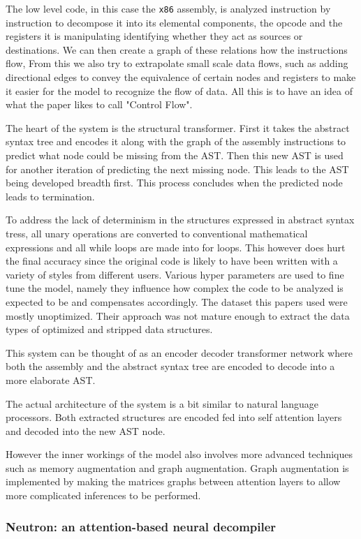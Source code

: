 \documentclass{article}
\begin{document}
The low level code, in this case the \verb|x86| assembly, is analyzed instruction by instruction to decompose it into its elemental components, the opcode and the registers it is manipulating identifying whether they act as sources or destinations.
We can then create a graph of these relations how the instructions flow,
From this we also try to extrapolate small scale data flows, such as adding directional edges to convey the equivalence of certain nodes and registers to make it easier for the model to recognize the flow of data.
All this is to have an idea of what the paper likes to call "Control Flow".

The heart of the system is the structural transformer.
First it takes the abstract syntax tree and encodes it along with the graph of the assembly instructions to predict what node could be missing from the AST.
Then this new AST is used for another iteration of predicting the next missing node.
This leads to the AST being developed breadth first.
This process concludes when the predicted node leads to termination.

To address the lack of determinism in the structures expressed in abstract syntax tress, all unary operations are converted to conventional mathematical expressions and all while loops are made into for loops.
This however does hurt the final accuracy since the original code is likely to have been written with a variety of styles from different users.
Various hyper parameters are used to fine tune the model, namely they influence how complex the code to be analyzed is expected to be and compensates accordingly.
The dataset this papers used were mostly unoptimized. Their approach was not mature enough to extract the data types of optimized and stripped data structures.

This system can be thought of as an encoder decoder transformer network where both the assembly and the abstract syntax tree are encoded to decode into a more elaborate AST.

The actual architecture of the system is a bit similar to natural language processors.
Both extracted structures are encoded fed into self attention layers and decoded into the new AST node.

However the inner workings of the model also involves more advanced techniques such as memory augmentation and graph augmentation.
Graph augmentation is implemented by making the matrices graphs between attention layers to allow more complicated inferences to be performed.

\subsubsection{Neutron: an attention-based neural decompiler}
\end{document}
